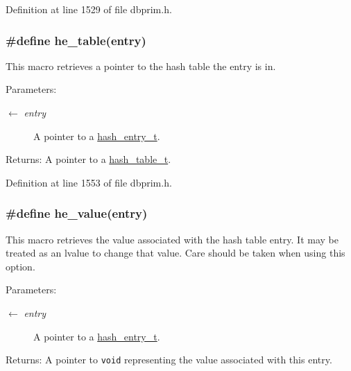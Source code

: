 Definition at line 1529 of file dbprim.h.\hypertarget{group__dbprim__hash_ga41}{
\subsubsection[he\_\-table]{\setlength{\rightskip}{0pt plus 5cm}\#define he\_\-table(entry)}}
\label{group__dbprim__hash_ga41}


This macro retrieves a pointer to the hash table the entry is in.

\begin{Desc}
\item[Parameters:]
\begin{description}
\item[\mbox{$\leftarrow$} {\em entry}]A pointer to a \hyperlink{group__dbprim__hash_ga2}{hash\_\-entry\_\-t}.\end{description}
\end{Desc}
\begin{Desc}
\item[Returns:]A pointer to a \hyperlink{group__dbprim__hash_ga1}{hash\_\-table\_\-t}.\end{Desc}


Definition at line 1553 of file dbprim.h.\hypertarget{group__dbprim__hash_ga44}{
\subsubsection[he\_\-value]{\setlength{\rightskip}{0pt plus 5cm}\#define he\_\-value(entry)}}
\label{group__dbprim__hash_ga44}


This macro retrieves the value associated with the hash table entry. It may be treated as an lvalue to change that value. Care should be taken when using this option.

\begin{Desc}
\item[Parameters:]
\begin{description}
\item[\mbox{$\leftarrow$} {\em entry}]A pointer to a \hyperlink{group__dbprim__hash_ga2}{hash\_\-entry\_\-t}.\end{description}
\end{Desc}
\begin{Desc}
\item[Returns:]A pointer to {\tt void} representing the value associated with this entry.\end{Desc}


